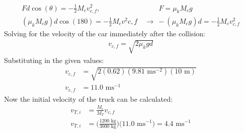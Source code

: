 \documentclass[a4paper]{article}
\begin{document}
\begin{shaded}
    \begin{align*}
        Fd\cos(\theta) = -\frac{1}{2}M_c v^2_{c,f},&\qquad F = \mu_k M_c g\\
        (\mu_kM_cg)d\cos(180) = -\frac{1}{2}M_cv^2{c,f} \ &\boldsymbol{\to}\ -(\mu_kM_cg)d = -\frac{1}{2}M_c v^2_{c,f}
    \end{align*}
    Solving for the velocity of the car immediately after the collision:
    \begin{align*}
        v_{c,f} = \sqrt{2\mu_kgd}
    \end{align*}
    Substituting in the given values:
    \begin{align*}
        v_{c,f} &= \sqrt{2(0.62)(9.81\text{ ms}^{-2})(10\text{ m})}\\
        v_{c,f} &= 11.0\text{ ms}^{-1}
    \end{align*}
    Now the initial velocity of the truck can be calculated:
    \begin{align*}
        v_{T,i} &= \frac{M_c}{M_T}v_{c,f}\\
        v_{T,i} &= \bigg(\frac{1200\text{ kg}}{3000\text{ kg}}\bigg)\Big(11.0\text{ ms}^{-1}\Big) = 4.4\text{ ms}^{-1}
    \end{align*}
\end{shaded}
\end{document}
